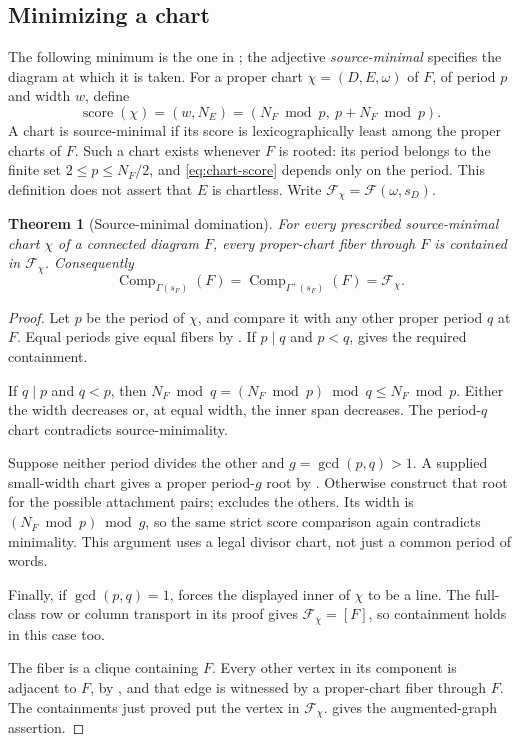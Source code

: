 \documentclass[11pt,a4paper]{amsart}
\numberwithin{equation}{section}
\theoremstyle{plain}
\newtheorem{theorem}{Theorem}[section]
\theoremstyle{definition}
\begin{document}
\subsection{Minimizing a chart}

The following minimum is the one in \cite[Def.~5.5]{McNamara2009Classification}; the adjective \emph{source-minimal} specifies the diagram at which it is taken.  For a proper chart \(\chi=(D,E,\omega)\) of \(F\), of period \(p\) and width \(w\), define
\begin{equation}\label{eq:chart-score}
 \operatorname{score}(\chi)=(w,N_E)
   =(N_F\bmod p,\ p+N_F\bmod p).
\end{equation}
A chart is source-minimal if its score is lexicographically least among the proper charts of \(F\).  Such a chart exists whenever \(F\) is rooted: its period belongs to the finite set \(2\le p\le N_F/2\), and \eqref{eq:chart-score} depends only on the period.  This definition does not assert that \(E\) is chartless.  Write \(\mathcal F_\chi=\mathcal F(\omega,s_D)\).

\begin{theorem}[Source-minimal domination]\label{thm:source-minimal-domination}
For every prescribed source-minimal chart \(\chi\) of a connected diagram \(F\), every proper-chart fiber through \(F\) is contained in \(\mathcal F_\chi\).  Consequently
\[
 \operatorname{Comp}_{\Gamma(s_F)}(F)
 =\operatorname{Comp}_{\Gamma^+(s_F)}(F)=\mathcal F_\chi.
\]
\end{theorem}
\begin{proof}
Let \(p\) be the period of \(\chi\), and compare it with any other proper period \(q\) at \(F\).  Equal periods give equal fibers by .  If \(p\mid q\) and \(p<q\),  gives the required containment.

If \(q\mid p\) and \(q<p\), then \(N_F\bmod q=(N_F\bmod p)\bmod q\le N_F\bmod p\).  Either the width decreases or, at equal width, the inner span decreases.  The period-\(q\) chart contradicts source-minimality.

Suppose neither period divides the other and \(g=\gcd(p,q)>1\).  A supplied small-width chart gives a proper period-\(g\) root by .  Otherwise  construct that root for the possible attachment pairs;  excludes the others.  Its width is \((N_F\bmod p)\bmod g\), so the same strict score comparison again contradicts minimality.  This argument uses a legal divisor chart, not just a common period of words.

Finally, if \(\gcd(p,q)=1\),  forces the displayed inner of \(\chi\) to be a line.  The full-class row or column transport in its proof gives \(\mathcal F_\chi=[F]\), so containment holds in this case too.

The fiber is a clique containing \(F\).  Every other vertex in its component is adjacent to \(F\), by , and that edge is witnessed by a proper-chart fiber through \(F\).  The containments just proved put the vertex in \(\mathcal F_\chi\).   gives the augmented-graph assertion.
\end{proof}
\end{document}
